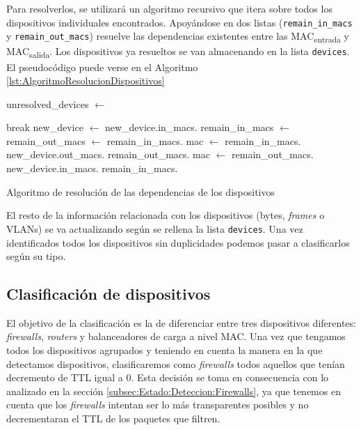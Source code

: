 \documentclass[twoside, 12pt]{epstfg}
\begin{document}
Para resolverlos, se utilizará un algoritmo recursivo que itera sobre todos los dispositivos individuales encontrados. Apoyándose en dos listas (\texttt{remain\_in\_macs} y \texttt{remain\_out\_macs}) resuelve las dependencias existentes entre las MAC\textsubscript{entrada} y MAC\textsubscript{salida}. Los dispositivos ya resueltos se van almacenando en la lista \texttt{devices}. El pseudocódigo puede verse en el Algoritmo \ref{lst:AlgoritmoResolucionDispositivos}
\begin{algorithm}[btp]
\begin{algorithmic}
\State unresolved\_devices $\gets$ 

        \State break
    \EndIf
    \State new\_device $\gets$ 
    \State new\_device.in\_macs.
    \State remain\_in\_macs $\gets$ 
    \State remain\_out\_macs $\gets$ 
    \State remain\_in\_macs.
        \State mac $\gets$ remain\_in\_macs.
            \State new\_device.out\_macs.
            \State remain\_out\_macs.
        \EndFor
            \State mac $\gets$ remain\_out\_macs.
                \State new\_device.in\_macs.
                \State remain\_in\_macs.
            \EndFor
        \EndWhile
    \EndWhile
\EndFor

\EndFunction
\end{algorithmic}
\caption{Algoritmo de resolución de las dependencias de los dispositivos}
\label{lst:AlgoritmoResolucionDispositivos}
\end{algorithm}
El resto de la información relacionada con los dispositivos (bytes, \textit{frames} o VLANs) se va actualizando según se rellena la lista \texttt{devices}. Una vez identificados todos los dispositivos sin duplicidades podemos pasar a clasificarlos según su tipo.

\subsection{Clasificación de dispositivos}
El objetivo de la clasificación es la de diferenciar entre tres dispositivos diferentes: \textit{firewalls}, \textit{routers} y balanceadores de carga a nivel MAC. Una vez que tengamos todos los dispositivos agrupados y teniendo en cuenta la manera en la que detectamos dispositivos, clasificaremos como \textit{firewalls} todos aquellos que tenían decremento de TTL igual a 0. Esta decisión se toma en consecuencia con lo analizado en la sección \ref{subsec:Estado:Deteccion:Firewalls}, ya que tenemos en cuenta que los \textit{firewalls} intentan ser lo más transparentes posibles y no decrementaran el TTL de los paquetes que filtren.
\end{document}
